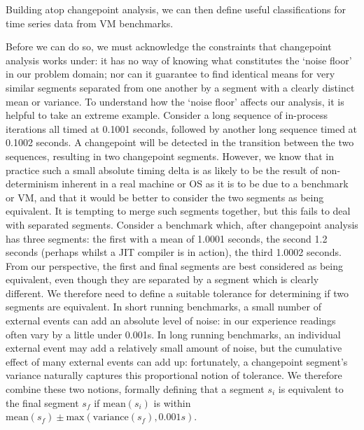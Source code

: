 \documentclass[acmsmall]{acmart}\settopmatter{printfolios=true}
\begin{document}
Building atop changepoint analysis, we can then define useful classifications
for time series data from VM benchmarks.

Before we can do so, we must
acknowledge the constraints that changepoint analysis works under: it has
no way of knowing what constitutes the `noise floor' in our problem domain; nor can it
guarantee to find identical means for very similar segments separated from
one another by a segment with a clearly distinct mean or variance.
To understand how the `noise floor' affects our analysis, it
is helpful to take an extreme example. Consider a long sequence of in-process
iterations all timed at 0.1001 seconds, followed by another long sequence timed
at 0.1002 seconds. A changepoint will be detected in the transition between the
two sequences, resulting in two changepoint segments. However, we know that in practice such a small absolute timing
delta is as likely to be the result of non-determinism inherent in a real
machine or OS as it is to be due to a benchmark or VM, and that it would be
better to consider the two segments as being equivalent. It is tempting to merge such segments
together, but this fails to deal with separated segments. Consider a
benchmark which, after changepoint analysis has three segments: the first with a
mean of 1.0001 seconds, the second 1.2 seconds (perhaps whilst a JIT compiler is
in action), the third 1.0002 seconds. From our perspective, the first and final
segments are best considered as being equivalent, even though they are separated by a
segment which is clearly different. We therefore need to define a suitable tolerance
for determining if two segments are equivalent. In short running benchmarks, a
small number of external events can add an absolute level of noise: in our
experience readings often vary by a
little under 0.001s. In long running benchmarks, an individual external
event may add a relatively small amount of noise, but the cumulative
effect of many external events can add up: fortunately, a changepoint segment's variance
naturally captures this proportional notion of tolerance. We therefore combine these two notions,
formally defining that a segment $s_i$
is equivalent to the final segment $s_f$ if $\textrm{mean}(s_i)$
is within $\textrm{mean}(s_f) \pm \textrm{max}(\textrm{variance}(s_f), 0.001s)$.
\end{document}
